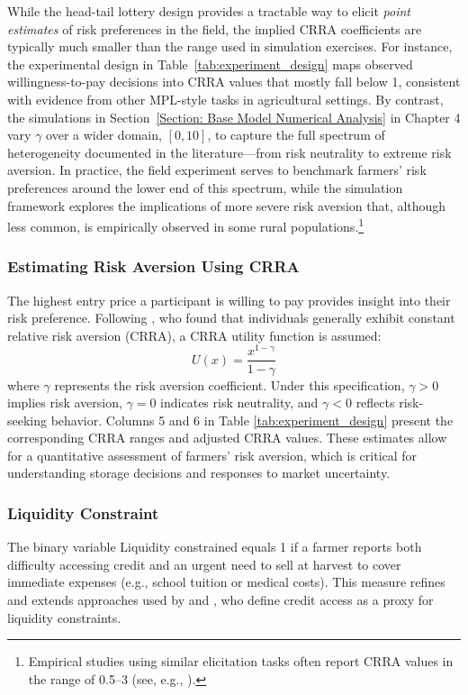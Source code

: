 While the head-tail lottery design provides a tractable way to elicit \textit{point estimates} of risk preferences in the field, the implied CRRA coefficients are typically much smaller than the range used in simulation exercises. For instance, the experimental design in Table~\ref{tab:experiment_design} maps observed willingness-to-pay decisions into CRRA values that mostly fall below 1, consistent with evidence from other MPL-style tasks in agricultural settings. By contrast, the simulations in Section~\ref{Section: Base Model Numerical Analysis} in Chapter 4 vary $\gamma$ over a wider domain, $[0,10]$, to capture the full spectrum of heterogeneity documented in the literature---from risk neutrality to extreme risk aversion. In practice, the field experiment serves to benchmark farmers' risk preferences around the lower end of this spectrum, while the simulation framework explores the implications of more severe risk aversion that, although less common, is empirically observed in some rural populations.\footnote{Empirical studies using similar elicitation tasks often report CRRA values in the range of 0.5--3 (see, e.g., \cite{liu2013time}).}



\subsubsection{Estimating Risk Aversion Using CRRA}  
\noindent The highest entry price a participant is willing to pay provides insight into their risk preference. Following \cite{chiappori2011relative}, who found that individuals generally exhibit constant relative risk aversion (CRRA), a CRRA utility function is assumed:  
\[
U(x) = \frac{x^{1-\gamma}}{1 - \gamma}
\]  
where $ \gamma $ represents the risk aversion coefficient. Under this specification, $ \gamma > 0 $ implies risk aversion, $ \gamma = 0 $ indicates risk neutrality, and $ \gamma < 0 $ reflects risk-seeking behavior. Columns 5 and 6 in Table \ref{tab:experiment_design} present the corresponding CRRA ranges and adjusted CRRA values. These estimates allow for a quantitative assessment of farmers' risk aversion, which is critical for understanding storage decisions and responses to market uncertainty.  

\subsubsection{Liquidity Constraint}  
\noindent The binary variable \textsf{Liquidity constrained} equals 1 if a farmer reports both difficulty accessing credit and an urgent need to sell at harvest to cover immediate expenses (e.g., school tuition or medical costs). This measure refines and extends approaches used by \cite{albuquerque2024market} and \cite{stephens2011incomplete}, who define credit access as a proxy for liquidity constraints.  

